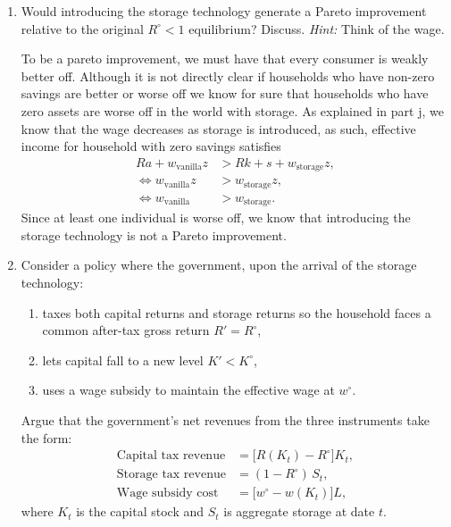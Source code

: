 \documentclass[11pt,english]{article}
\begin{document}
\begin{enumerate}
    \item[(l)] Would introducing the storage technology generate a Pareto
        improvement relative to the original $R^\circ < 1$ equilibrium? Discuss.
        \textit{Hint:} Think of the wage.
    \begin{solution}
To be a pareto improvement, we must have that every consumer is weakly better off. Although it is not directly clear if households who have non-zero savings are better or worse off we know for sure that households who have zero assets are worse off in the world with storage. As explained in part j, we know that the wage decreases as storage is introduced, as such, effective income for household with zero savings satisfies
\begin{align*}
Ra + w_{\text{vanilla}}z &> Rk + s + w_{\text{storage}}z,\\
\Leftrightarrow w_{\text{vanilla}}z &> w_{\text{storage}}z,\\
\Leftrightarrow w_{\text{vanilla}} &> w_{\text{storage}}.
\end{align*}Since at least one individual is worse off, we know that introducing the storage technology is not a Pareto improvement.
    \end{solution}
 
    \item[(m)] Consider a policy where the government, upon the arrival of the
        storage technology:
        \begin{enumerate}
            \item[(i)] taxes both capital returns and storage returns so the
                household faces a common after-tax gross return $R' = R^\circ$,
            \item[(ii)] lets capital fall to a new level $K' < K^\circ$,
            \item[(iii)] uses a wage subsidy to maintain the effective wage at
                $w^\circ$.
        \end{enumerate}
 
        Argue that the government's net revenues from the three instruments take
        the form:
        \begin{align*}
            \text{Capital tax revenue}  &= \bigl[R(K_t) - R^\circ\bigr] K_t, \\
            \text{Storage tax revenue}  &= (1 - R^\circ)\, S_t, \\
            \text{Wage subsidy cost}    &= \bigl[w^\circ - w(K_t)\bigr] L,
        \end{align*}
        where $K_t$ is the capital stock and $S_t$ is aggregate storage at date
        $t$.
 

\end{enumerate}
\end{document}
